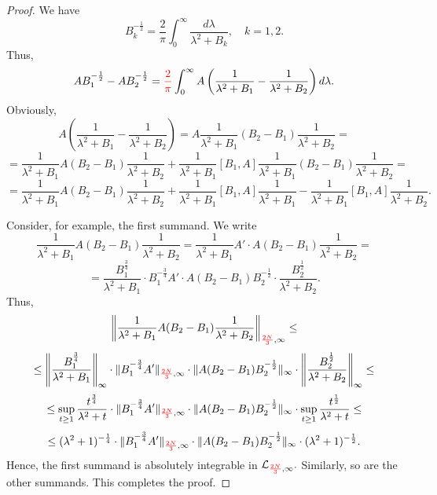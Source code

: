 \documentclass{amsart}
\begin{document}
\begin{proof}
We have
$$
B_k^{-\frac12}
=
\frac{2}{\pi}
\int_0^{\infty}
\frac{d\lambda}{\lambda^2+B_k},
\quad k=1,2.
$$
Thus,
$$
AB_1^{-\frac12}-AB_2^{-\frac12}
=
{\color{red}\frac{2}{\pi}}
\int_0^{\infty}
A\left(
\frac1{\lambda^2+B_1}
-
\frac1{\lambda^2+B_2}
\right)d\lambda.
$$
Obviously,
$$
A\left(
\frac1{\lambda^2+B_1}
-
\frac1{\lambda^2+B_2}
\right)
=
A\frac1{\lambda^2+B_1}
(B_2-B_1)
\frac1{\lambda^2+B_2}
=
$$
$$
=
\frac1{\lambda^2+B_1}
A(B_2-B_1)
\frac1{\lambda^2+B_2}
+
\frac1{\lambda^2+B_1}
[B_1,A]
\frac1{\lambda^2+B_1}
(B_2-B_1)
\frac1{\lambda^2+B_2}
=
$$
$$
=
\frac1{\lambda^2+B_1}
A(B_2-B_1)
\frac1{\lambda^2+B_2}
+
\frac1{\lambda^2+B_1}
[B_1,A]
\frac1{\lambda^2+B_1}
-
\frac1{\lambda^2+B_1}
[B_1,A]
\frac1{\lambda^2+B_2}.
$$

Consider, for example, the first summand. We write
$$
\frac1{\lambda^2+B_1}
A(B_2-B_1)
\frac1{\lambda^2+B_2}
=
\frac1{\lambda^2+B_1}
A'\cdot A(B_2-B_1)
\frac1{\lambda^2+B_2}
=
$$
$$
=
\frac{B_1^{\frac34}}{\lambda^2+B_1}
\cdot B_1^{-\frac34}A'
\cdot A(B_2-B_1)B_2^{-\frac12}
\cdot\frac{B_2^{\frac12}}{\lambda^2+B_2}.
$$
Thus,
$$
\left\|
\frac1{\lambda^2+B_1}
A(B_2-B_1)
\frac1{\lambda^2+B_2}
\right\|_{{\color{red}\frac{2N}{3}},\infty}
\leq
$$
$$
\leq
\left\|
\frac{B_1^{\frac34}}{\lambda^2+B_1}
\right\|_{\infty}
\cdot
\|B_1^{-\frac34}A'\|_{{\color{red}\frac{2N}{3}},\infty}
\cdot
\|A(B_2-B_1)B_2^{-\frac12}\|_{\infty}
\cdot
\left\|
\frac{B_2^{\frac12}}{\lambda^2+B_2}
\right\|_{\infty}
\leq
$$
$$
\leq
\sup_{t\geq1}
\frac{t^{\frac34}}{\lambda^2+t}
\cdot
\|B_1^{-\frac34}A'\|_{{\color{red}\frac{2N}{3}},\infty}
\cdot
\|A(B_2-B_1)B_2^{-\frac12}\|_{\infty}
\cdot
\sup_{t\geq1}
\frac{t^{\frac12}}{\lambda^2+t}
\leq
$$
$$
\leq
(\lambda^2+1)^{-\frac14}
\cdot
\|B_1^{-\frac34}A'\|_{{\color{red}\frac{2N}{3}},\infty}
\cdot
\|A(B_2-B_1)B_2^{-\frac12}\|_{\infty}
\cdot
(\lambda^2+1)^{-\frac12}.
$$
Hence, the first summand is absolutely integrable
in $\mathcal{L}_{{\color{red}\frac{2N}{3}},\infty}.$
Similarly, so are the other summands.
This completes the proof.
\end{proof}
\end{document}
